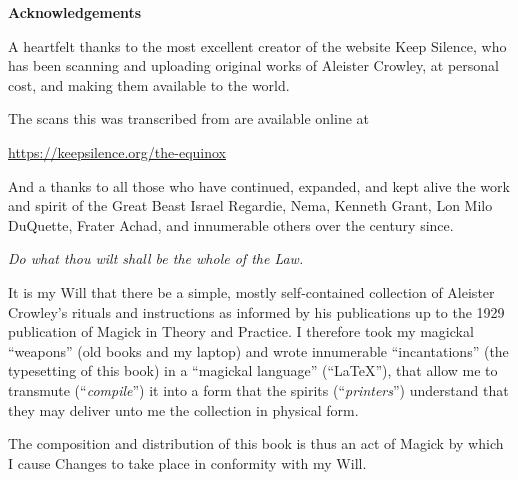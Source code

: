 {
\vspace*{\fill}
\begin{center}
\huge
\textbf{Acknowledgements}
\end{center}

A heartfelt thanks to the most excellent creator of the website Keep Silence, who has been scanning and uploading original works of Aleister Crowley, at personal cost, and making them available to the world.

The scans this was transcribed from are available online at

\begin{center}
\url{https://keepsilence.org/the-equinox}
\end{center}

And a thanks to all those who have continued, expanded, and kept alive the work and spirit of the Great Beast \textemdash{} Israel Regardie, Nema, Kenneth Grant, Lon Milo DuQuette, Frater Achad, and innumerable others over the century since.

\vspace*{\fill}
}


\textit{Do what thou wilt shall be the whole of the Law.}


It is my Will that there be a simple, mostly self-contained collection of Aleister Crowley's rituals and instructions as informed by his publications up to the 1929 publication of Magick in Theory and Practice. I therefore took my magickal \enquote{weapons} (old books and my laptop) and wrote innumerable \enquote{incantations} (the typesetting of this book) in a \enquote{magickal language} (\enquote{\LaTeX}), that allow me to transmute (\enquote{\textit{compile}}) it into a form that the spirits (\enquote{\textit{printers}}) understand that they may deliver unto me the collection in physical form.

The composition and distribution of this book is thus an act of Magick by which I cause Changes to take place in conformity with my Will.

